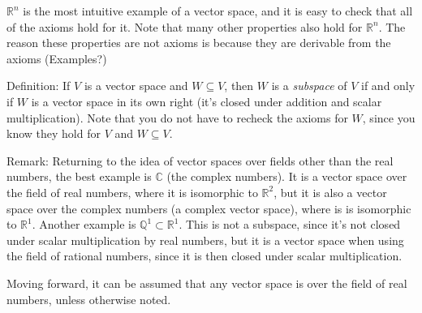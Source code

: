$\mathbb{R}^{n}$ is the most intuitive example of a vector space, and it is easy to check that all of the axioms hold for it. Note
that many other properties also hold for $\mathbb{R}^n$. The reason these properties are not axioms is because they are derivable
from the axioms (Examples?)

Definition: If $V$ is a vector space and $W \subseteq V$, then $W$ is a \textit{subspace} of $V$ if and only if $W$ is a vector space
in its own right (it's closed under addition and scalar multiplication). Note that you do not have to recheck the axioms for $W$,
since you know they hold for $V$ and $W \subseteq V$.

Remark: Returning to the idea of vector spaces over fields other than the real numbers, the best example is $\mathbb{C}$ (the complex numbers).
It is a vector space over the field of real numbers, where it is isomorphic to $\mathbb{R}^2$, but it is also a vector space over the complex
numbers (a complex vector space), where is is isomorphic to $\mathbb{R}^1$. Another example is $\mathbb{Q}^1 \subset \mathbb{R}^1$. This is
not a subspace, since it's not closed under scalar multiplication by real numbers, but it is a vector space  when using the field of rational
numbers, since it is then closed under scalar multiplication.

Moving forward, it can be assumed that any vector space is over the field of real numbers, unless otherwise noted.

